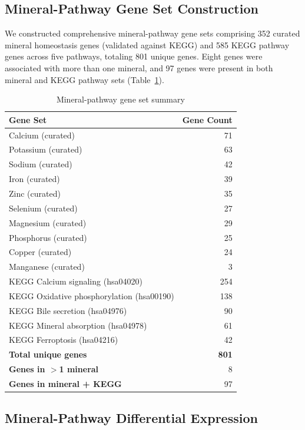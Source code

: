 \documentclass[11pt,a4paper]{article}
\begin{document}
\subsection{Mineral-Pathway Gene Set Construction}

We constructed comprehensive mineral-pathway gene sets comprising 352 curated mineral homeostasis genes (validated against KEGG) and 585 KEGG pathway genes across five pathways, totaling 801 unique genes. Eight genes were associated with more than one mineral, and 97 genes were present in both mineral and KEGG pathway sets (Table~\ref{tab:genesets}).

\begin{table}[H]
\centering
\caption{Mineral-pathway gene set summary}
\label{tab:genesets}
\begin{tabular}{lr}
\toprule
\textbf{Gene Set} & \textbf{Gene Count} \\
\midrule
Calcium (curated) & 71 \\
Potassium (curated) & 63 \\
Sodium (curated) & 42 \\
Iron (curated) & 39 \\
Zinc (curated) & 35 \\
Selenium (curated) & 27 \\
Magnesium (curated) & 29 \\
Phosphorus (curated) & 25 \\
Copper (curated) & 24 \\
Manganese (curated) & 3 \\
\midrule
KEGG Calcium signaling (hsa04020) & 254 \\
KEGG Oxidative phosphorylation (hsa00190) & 138 \\
KEGG Bile secretion (hsa04976) & 90 \\
KEGG Mineral absorption (hsa04978) & 61 \\
KEGG Ferroptosis (hsa04216) & 42 \\
\midrule
\textbf{Total unique genes} & \textbf{801} \\
\textbf{Genes in $>$1 mineral} & 8 \\
\textbf{Genes in mineral + KEGG} & 97 \\
\bottomrule
\end{tabular}
\end{table}

\subsection{Mineral-Pathway Differential Expression}
\end{document}
